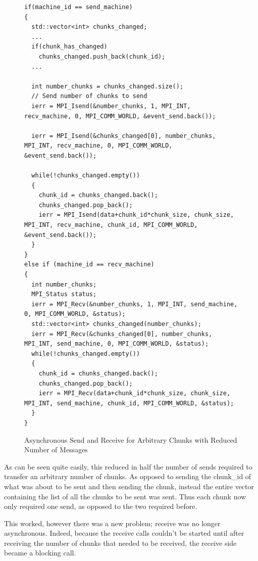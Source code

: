 \documentclass[../thesis.tex]{subfiles}
\begin{document}
    \begin{figure}[htbp]
      \centering
      \lstset{language=cpp}  
      \begin{lstlisting}[tabsize=2]
if(machine_id == send_machine)
{
  std::vector<int> chunks_changed;
  ...
  if(chunk_has_changed)
    chunks_changed.push_back(chunk_id);
  ...

  int number_chunks = chunks_changed.size();
  // Send number of chunks to send
  ierr = MPI_Isend(&number_chunks, 1, MPI_INT, recv_machine, 0, MPI_COMM_WORLD, &event_send.back());

  ierr = MPI_Isend(&chunks_changed[0], number_chunks, MPI_INT, recv_machine, 0, MPI_COMM_WORLD, &event_send.back());

  while(!chunks_changed.empty())
  {
    chunk_id = chunks_changed.back();
    chunks_changed.pop_back();
    ierr = MPI_Isend(data+chunk_id*chunk_size, chunk_size, MPI_INT, recv_machine, chunk_id, MPI_COMM_WORLD, &event_send.back());
  }
}
else if (machine_id == recv_machine)
{
  int number_chunks;
  MPI_Status status;
  ierr = MPI_Recv(&number_chunks, 1, MPI_INT, send_machine, 0, MPI_COMM_WORLD, &status);
  std::vector<int> chunks_changed(number_chunks);
  ierr = MPI_Recv(&chunks_changed[0], number_chunks, MPI_INT, send_machine, 0, MPI_COMM_WORLD, &status);
  while(!chunks_changed.empty())
  {
    chunk_id = chunks_changed.back();
    chunks_changed.pop_back();
    ierr = MPI_Recv(data+chunk_id*chunk_size, chunk_size, MPI_INT, send_machine, chunk_id, MPI_COMM_WORLD, &status);
  }       
}
        \end{lstlisting}

      \caption{Asynchronous Send and Receive for Arbitrary Chunks with Reduced Number of Messages}
      \label{fig:final_send_receive}
    \end{figure}


    As can be seen quite easily, this reduced in half the number of sends required to transfer an arbitrary number of chunks. As opposed to sending the chunk\_id of what was about to be sent and then sending the chunk, instead the entire vector containing the list of all the chunks to be sent was sent. Thus each chunk now only required one send, as opposed to the two required before.

    This worked, however there was a new problem; receive was no longer asynchronous. Indeed, because the receive calls couldn't be started until after receiving the number of chunks that needed to be received, the receive side became a blocking call.
\end{document}
